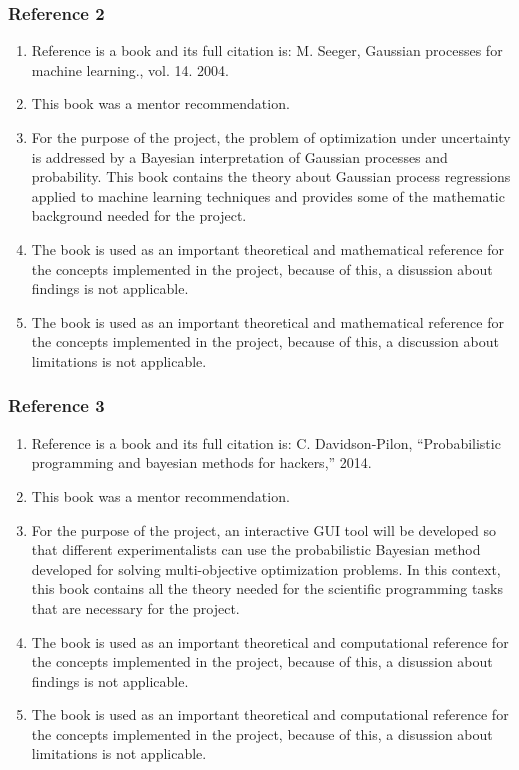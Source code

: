 \documentclass{journal}
\begin{document}
\subsubsection{Reference 2}
\begin{enumerate}
	\item Reference  \cite{Seeger2004} is a book and its full citation is: M. Seeger, Gaussian processes for machine learning., vol. 14. 2004.
	\item This book was a mentor recommendation.
	\item For the purpose of the project, the problem of optimization under uncertainty is addressed by a Bayesian interpretation of Gaussian processes and probability. This book contains the theory about Gaussian process regressions applied to machine learning techniques and provides some of the mathematic background needed for the project.
	\item The book is used as an important theoretical and mathematical reference for the concepts implemented in the project, because of this, a disussion about findings is not applicable.
	\item The book is used as an important theoretical and mathematical reference for the concepts implemented in the project, because of this, a discussion about limitations is not applicable.
\end{enumerate}

\subsubsection{Reference 3}
\begin{enumerate}
	\item Reference \cite{Davidson-Pilon2014} is a book and its full citation is: C. Davidson-Pilon, “Probabilistic programming and bayesian methods for hackers,” 2014.
	\item This book was a mentor recommendation.
	\item For the purpose of the project, an interactive GUI tool will be developed so that different experimentalists can use the probabilistic Bayesian method developed for solving multi-objective optimization problems. In this context, this book contains all the theory needed for the scientific programming tasks that are necessary for the project. 
	\item The book is used as an important theoretical and computational reference for the concepts implemented in the project, because of this, a disussion about findings is not applicable.
	\item The book is used as an important theoretical and computational reference for the concepts implemented in the project, because of this, a disussion about limitations is not applicable.
\end{enumerate}
\end{document}
